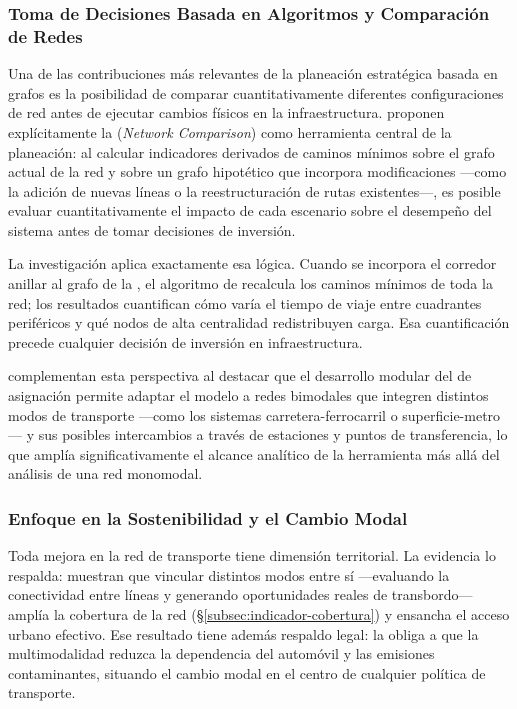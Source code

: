 \subsubsection{Toma de Decisiones Basada en Algoritmos y Comparación de Redes}
\label{subsubsec:comparacion-redes}

Una de las contribuciones más relevantes de la planeación estratégica basada en
grafos es la posibilidad de comparar cuantitativamente diferentes
configuraciones de red antes de ejecutar cambios físicos en la infraestructura.
\citet{fortin2016innovative} proponen explícitamente la
 (\textit{Network Comparison}) como herramienta
central de la planeación: al calcular indicadores derivados de caminos mínimos
sobre el grafo actual de la red y sobre un grafo hipotético que incorpora
modificaciones ---como la adición de nuevas líneas o la reestructuración de
rutas existentes---, es posible evaluar cuantitativamente el impacto de cada
escenario sobre el desempeño del sistema antes de tomar decisiones de inversión.

La investigación aplica exactamente esa lógica. Cuando se incorpora el corredor
anillar al grafo de la \zmvm{}, el algoritmo de \dijkstra{} recalcula los
caminos mínimos de toda la red; los resultados cuantifican cómo varía el tiempo
de viaje entre cuadrantes periféricos y qué nodos de alta centralidad
redistribuyen carga. Esa cuantificación precede cualquier decisión de inversión
en infraestructura.

\citet{moreno2023} complementan esta perspectiva al destacar que el desarrollo
modular del  de asignación permite adaptar el modelo a redes bimodales
que integren distintos modos de transporte ---como los sistemas
carretera-ferrocarril o superficie-metro--- y sus posibles intercambios a través
de estaciones y puntos de transferencia, lo que amplía significativamente el
alcance analítico de la herramienta más allá del análisis de una red monomodal.

\subsubsection{Enfoque en la Sostenibilidad y el Cambio Modal}
\label{subsubsec:sostenibilidad-cambio-modal}

Toda mejora en la red de transporte tiene dimensión territorial. La evidencia lo
respalda: \citet{ugur2025} muestran que vincular distintos modos entre sí
---evaluando la conectividad entre líneas y generando oportunidades reales de
transbordo--- amplía la cobertura de la red (§\ref{subsec:indicador-cobertura}) y
ensancha el acceso urbano efectivo. Ese resultado tiene además respaldo legal:
la \citet{lgmsv2022} obliga a que la multimodalidad reduzca la dependencia del
automóvil y las emisiones contaminantes, situando el cambio modal en el centro
de cualquier política de transporte.

